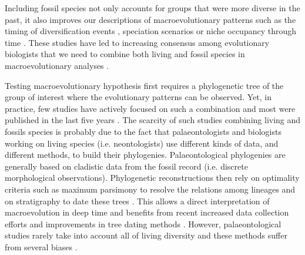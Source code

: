 Including fossil species not only accounts for groups that were more diverse in the past, it also improves our descriptions of macroevolutionary patterns such as the timing of diversification events \citep[e.g. significantly reducing node age confidence intervals;][]{ronquista2012}, speciation scenarios \citep[e.g. revealing hidden vicariance patterns;][]{Wood01032013} or niche occupancy through time \citep[e.g.][]{pearmanniche2008}.
These studies have led to increasing consensus among evolutionary biologists that we need to combine both living and fossil species in macroevolutionary analyses \citep{jacksonwhat2006,quentaldiversity2010,dietlconservation2011,slaterunifying2013,fritzdiversity2013,benton2015}.


Testing macroevolutionary hypothesis first requires a phylogenetic tree of the group of interest where the evolutionary patterns can be observed.
Yet, in practice, few studies have actively focused on such a combination and most were published in the last five years \citep[e.g.][]{ronquista2012,slaterphylogenetic2013,Wood01032013,beckancient2014}.
The scarcity of such studies combining living and fossils species is probably due to the fact that palaeontologists and biologists working on living species (i.e. neontologists) %
use different kinds of data, and different methods, to build their phylogenies.
Palaeontological phylogenies are generally based on cladistic data from the fossil record (i.e. discrete morphological observations).
Phylogenetic reconstructions then rely on optimality criteria such as maximum parsimony \citep{Hennig1966,felsenstein2004} to resolve the relations among lineages and on stratigraphy to date these trees \citep{GoloboffTNT}.
This allows a direct interpretation of macroevolution in deep time and benefits from recent increased data collection efforts \citep[e.g. 4541 characters in][introducing the term ``phenomics'']{O'Leary08022013} and improvements in tree dating methods \citep[e.g. the \textit{cal3} method from][]{Bapst2014}.
However, palaeontological studies rarely take into account all of living diversity \citep[e.g. only 38 out of 351 living primates are included with 119 fossils in][]{ni2013oldest} and these methods suffer from several biases \citep[e.g. parsimony;][]{wrightbayesian2014}. %

